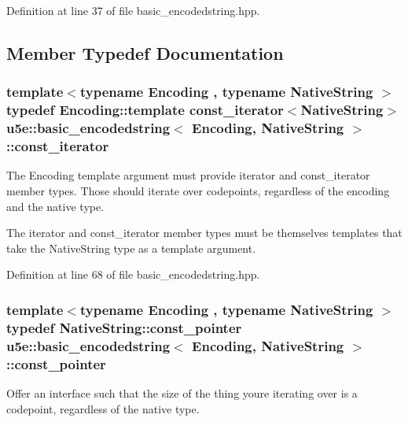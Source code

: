 Definition at line 37 of file basic\+\_\+encodedstring.\+hpp.



\subsection{Member Typedef Documentation}
\subsubsection[{\texorpdfstring{const\+\_\+iterator}{const_iterator}}]{\setlength{\rightskip}{0pt plus 5cm}template$<$typename Encoding , typename Native\+String $>$ typedef Encoding\+::template {\bf const\+\_\+iterator}$<$Native\+String$>$ {\bf u5e\+::basic\+\_\+encodedstring}$<$ Encoding, Native\+String $>$\+::{\bf const\+\_\+iterator}}\hypertarget{classu5e_1_1basic__encodedstring_a249da58e8bad9c91fab547516f90c60d}{}\label{classu5e_1_1basic__encodedstring_a249da58e8bad9c91fab547516f90c60d}
The Encoding template argument must provide iterator and const\+\_\+iterator member types. Those should iterate over codepoints, regardless of the encoding and the native type.

The iterator and const\+\_\+iterator member types must be themselves templates that take the Native\+String type as a template argument. 

Definition at line 68 of file basic\+\_\+encodedstring.\+hpp.

\subsubsection[{\texorpdfstring{const\+\_\+pointer}{const_pointer}}]{\setlength{\rightskip}{0pt plus 5cm}template$<$typename Encoding , typename Native\+String $>$ typedef Native\+String\+::const\+\_\+pointer {\bf u5e\+::basic\+\_\+encodedstring}$<$ Encoding, Native\+String $>$\+::{\bf const\+\_\+pointer}}\hypertarget{classu5e_1_1basic__encodedstring_aa26a9042f17c34e711979c7089045ee2}{}\label{classu5e_1_1basic__encodedstring_aa26a9042f17c34e711979c7089045ee2}
Offer an interface such that the size of the thing you\textquotesingle{}re iterating over is a codepoint, regardless of the native type. 

